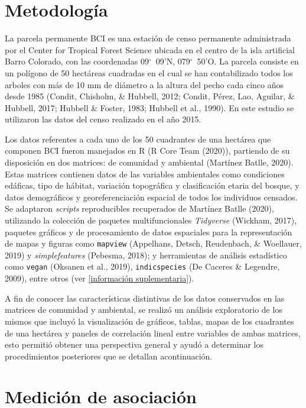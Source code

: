 \documentclass[11pt,]{article}
\begin{document}
\section{Metodología}\label{metodologuxeda}

La parcela permanente BCI es una estación de censo permanente
administrada por el Center for Tropical Forest Science ubicada en el
centro de la isla artificial Barro Colorado, con las coordenadas
09\(^\circ\)~09'N, 079\(^\circ\)~50'O. La parcela consiste en un
polígono de 50 hectáreas cuadradas en el cual se han contabilizado todos
los arboles con más de 10 mm de diámetro a la altura del pecho cada
cinco años desde 1985 (Condit, Chisholm, \& Hubbell, 2012; Condit,
Pérez, Lao, Aguilar, \& Hubbell, 2017; Hubbell \& Foster, 1983; Hubbell
et al., 1990). En este estudio se utilizaron las datos del censo
realizado en el año 2015.

Los datos referentes a cada uno de los 50 cuadrantes de una hectárea que
componen BCI fueron manejados en R (R Core Team (2020)), partiendo de su
disposición en dos matrices: de comunidad y ambiental (Martínez Batlle,
2020). Estas matrices contienen datos de las variables ambientales como
condiciones edáficas, tipo de hábitat, variación topográfica y
clasificación etaria del bosque, y datos demográficos y
georeferenciación espacial de todos los individuos censados. Se
adaptaron \emph{scripts} reproducibles recuperados de Martínez Batlle
(2020), utilizando la colección de paquetes multifuncionales
\emph{Tidyverse} (Wickham, 2017), paquetes gráficos y de procesamiento
de datos espaciales para la representación de mapas y figuras como
\texttt{mapview} (Appelhans, Detsch, Reudenbach, \& Woellauer, 2019) y
\emph{simplefeatures} (Pebesma, 2018); y herramientas de análisis
estadístico como \texttt{vegan} (Oksanen et al., 2019),
\texttt{indicspecies} (De Caceres \& Legendre, 2009), entre otros (ver
\ref{información suplementaria}).

A fin de conocer las características distintivas de los datos
conservados en las matrices de comunidad y ambiental, se realizó un
análisis exploratorio de los mismos que incluyó la visualización de
gráficos, tablas, mapas de los cuadrantes de una hectárea y paneles de
correlación lineal entre variables de ambas matrices, esto permitió
obtener una perspectiva general y ayudó a determinar los procedimientos
posteriores que se detallan acontinuación.

\section{Medición de asociación}\label{mediciuxf3n-de-asociaciuxf3n}
\end{document}
